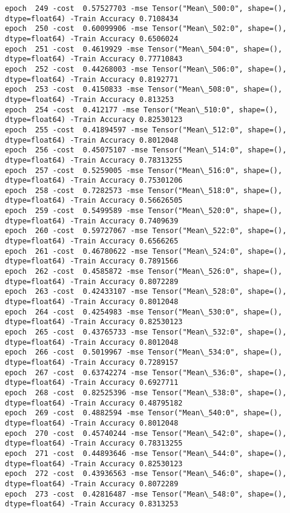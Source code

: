 \documentclass[11pt]{article}
\begin{document}
\begin{Verbatim}[commandchars=\\\{\}]
epoch  249 -cost  0.57527703 -mse Tensor("Mean\_500:0", shape=(), dtype=float64) -Train Accuracy 0.7108434
epoch  250 -cost  0.60099906 -mse Tensor("Mean\_502:0", shape=(), dtype=float64) -Train Accuracy 0.6506024
epoch  251 -cost  0.4619929 -mse Tensor("Mean\_504:0", shape=(), dtype=float64) -Train Accuracy 0.77710843
epoch  252 -cost  0.44268003 -mse Tensor("Mean\_506:0", shape=(), dtype=float64) -Train Accuracy 0.8192771
epoch  253 -cost  0.4150833 -mse Tensor("Mean\_508:0", shape=(), dtype=float64) -Train Accuracy 0.813253
epoch  254 -cost  0.412177 -mse Tensor("Mean\_510:0", shape=(), dtype=float64) -Train Accuracy 0.82530123
epoch  255 -cost  0.41894597 -mse Tensor("Mean\_512:0", shape=(), dtype=float64) -Train Accuracy 0.8012048
epoch  256 -cost  0.45075107 -mse Tensor("Mean\_514:0", shape=(), dtype=float64) -Train Accuracy 0.78313255
epoch  257 -cost  0.5259005 -mse Tensor("Mean\_516:0", shape=(), dtype=float64) -Train Accuracy 0.75301206
epoch  258 -cost  0.7282573 -mse Tensor("Mean\_518:0", shape=(), dtype=float64) -Train Accuracy 0.56626505
epoch  259 -cost  0.5499589 -mse Tensor("Mean\_520:0", shape=(), dtype=float64) -Train Accuracy 0.7409639
epoch  260 -cost  0.59727067 -mse Tensor("Mean\_522:0", shape=(), dtype=float64) -Train Accuracy 0.6566265
epoch  261 -cost  0.46780622 -mse Tensor("Mean\_524:0", shape=(), dtype=float64) -Train Accuracy 0.7891566
epoch  262 -cost  0.4585872 -mse Tensor("Mean\_526:0", shape=(), dtype=float64) -Train Accuracy 0.8072289
epoch  263 -cost  0.42433107 -mse Tensor("Mean\_528:0", shape=(), dtype=float64) -Train Accuracy 0.8012048
epoch  264 -cost  0.4254983 -mse Tensor("Mean\_530:0", shape=(), dtype=float64) -Train Accuracy 0.82530123
epoch  265 -cost  0.43765733 -mse Tensor("Mean\_532:0", shape=(), dtype=float64) -Train Accuracy 0.8012048
epoch  266 -cost  0.5019967 -mse Tensor("Mean\_534:0", shape=(), dtype=float64) -Train Accuracy 0.7289157
epoch  267 -cost  0.63742274 -mse Tensor("Mean\_536:0", shape=(), dtype=float64) -Train Accuracy 0.6927711
epoch  268 -cost  0.82525396 -mse Tensor("Mean\_538:0", shape=(), dtype=float64) -Train Accuracy 0.48795182
epoch  269 -cost  0.4882594 -mse Tensor("Mean\_540:0", shape=(), dtype=float64) -Train Accuracy 0.8012048
epoch  270 -cost  0.45740244 -mse Tensor("Mean\_542:0", shape=(), dtype=float64) -Train Accuracy 0.78313255
epoch  271 -cost  0.44893646 -mse Tensor("Mean\_544:0", shape=(), dtype=float64) -Train Accuracy 0.82530123
epoch  272 -cost  0.43936563 -mse Tensor("Mean\_546:0", shape=(), dtype=float64) -Train Accuracy 0.8072289
epoch  273 -cost  0.42816487 -mse Tensor("Mean\_548:0", shape=(), dtype=float64) -Train Accuracy 0.8313253

\end{Verbatim}
\end{document}
